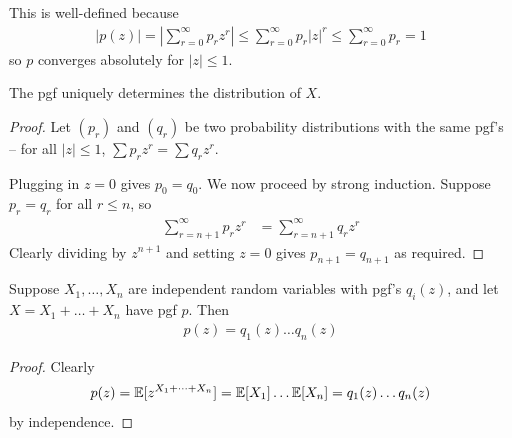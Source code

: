\documentclass{../template/note}
\begin{document}
    \begin{remark*}
        This is well-defined because
        \begin{align*}
            |p(z)| = \left|\sum_{r=0}^\infty p_rz^r\right| \leq \sum_{r=0}^\infty p_r |z|^r \leq \sum_{r=0}^\infty p_r = 1
        \end{align*}
        so \(p\) converges absolutely for \(|z| \leq 1\).        
    \end{remark*}
    
    \begin{theorem}
        The pgf uniquely determines the distribution of \(X\). \label{pgf-unique}
    \end{theorem}
    
    \begin{proof}
        Let \((p_r)\) and \((q_r)\) be two probability distributions with the same pgf's -- for all \(|z| \leq 1\), \(\sum p_r z^r = \sum q_r z^r\).

        Plugging in \(z=0\) gives \(p_0 = q_0\). We now proceed by strong induction. Suppose \(p_r = q_r\) for all \(r \leq n\), so
        \begin{align*}
            \sum_{r=n+1}^\infty p_r z^r &= \sum_{r=n+1}^\infty q_rz^r
        \end{align*}
        Clearly dividing by \(z^{n+1}\) and setting \(z=0\) gives \(p_{n+1} = q_{n+1}\) as required.        
    \end{proof}

    \begin{proposition}
        Suppose \(X_1, \dots, X_n\) are independent random variables with pgf's \(q_i(z)\), and let \(X = X_1 + \dots + X_n\) have pgf \(p\). Then
        \begin{align*}
            p(z) = q_1(z)\dots q_n(z)
        \end{align*}
    \end{proposition}
    
    \begin{proof}
        Clearly
        \begin{align*}
            p(z) = \mathbb E[z^{X_1+\dots+X_n}] = \mathbb E[X_1] \dots \mathbb E[X_n] = q_1(z) \dots q_n(z)
        \end{align*}
        by independence.        
    \end{proof}
\end{document}
